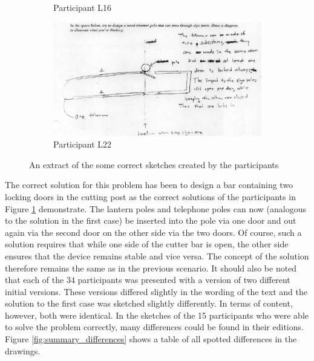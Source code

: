 \documentclass[12pt]{article}
\begin{document}
\begin{figure}[h!]
\begin{subfigure}[b]{0.3\linewidth}
    \caption{Participant L16}
  \end{subfigure}
  \begin{subfigure}[b]{0.3\linewidth}
    \includegraphics[width=\linewidth]{images/drawing_l22_con2.PNG}
    \caption{Participant L22}
  \end{subfigure}
  \caption{An extract of the some correct sketches created by the participants}
  \label{fig:coffee3}
\end{figure}

The correct solution for this problem has been to design a bar containing two locking doors in the cutting post as the correct solutions of the participants in Figure \ref{fig:coffee3} demonstrate. The lantern poles and telephone poles can now (analogous to the solution in the first case) be inserted into the pole via one door and out again via the second door on the other side via the two doors. Of course, such a solution requires that while one side of the cutter bar is open, the other side ensures that the device remains stable and vice versa. The concept of the solution therefore remains the same as in the previous scenario. It should also be noted that each of the 34 participants was presented with a version of two different initial versions. These versions differed slightly in the wording of the text and the solution to the first case was sketched slightly differently. In terms of content, however, both were identical. In the sketches of the 15 participants who were able to solve the problem correctly, many differences could be found in their editions. Figure \ref{fig:summary_differences} shows a table of all spotted differences in the drawings. 
\end{document}
